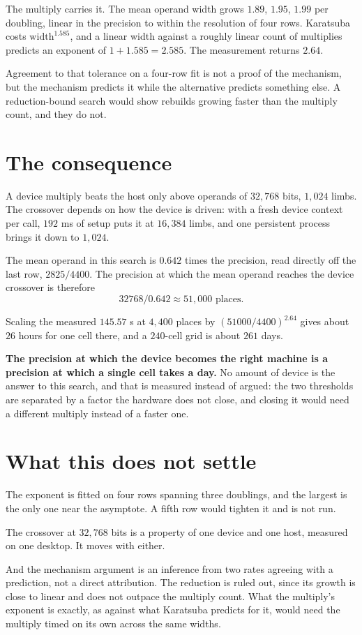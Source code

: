 The multiply carries it. The mean operand width grows \(1.89\), \(1.95\), \(1.99\) per doubling, linear
in the precision to within the resolution of four rows. Karatsuba costs \(\mathrm{width}^{1.585}\), and
a linear width against a roughly linear count of multiplies predicts an exponent of
\(1 + 1.585 = 2.585\). The measurement returns \(2.64\).

Agreement to that tolerance on a four-row fit is not a proof of the mechanism, but the mechanism
predicts it while the alternative predicts something else. A reduction-bound search would show
rebuilds growing faster than the multiply count, and they do not.

\section{The consequence}

A device multiply beats the host only above operands of \(32{,}768\) bits, \(1{,}024\) limbs. The
crossover depends on how the device is driven: with a fresh device context per call, \(192\) ms of
setup puts it at \(16{,}384\) limbs, and one persistent process brings it down to \(1{,}024\).

The mean operand in this search is \(0.642\) times the precision, read directly off the last row,
\(2825/4400\). The precision at which the mean operand reaches the device crossover is therefore
\[
32768 / 0.642 \approx 51{,}000 \text{ places}.
\]

Scaling the measured \(145.57\) s at \(4{,}400\) places by \((51000/4400)^{2.64}\) gives about \(26\)
hours for one cell there, and a \(240\)-cell grid is about \(261\) days.

\textbf{The precision at which the device becomes the right machine is a precision at which a single
cell takes a day.} No amount of device is the answer to this search, and that is measured instead of
argued: the two thresholds are separated by a factor the hardware does not close, and closing it would
need a different multiply instead of a faster one.

\section{What this does not settle}

The exponent is fitted on four rows spanning three doublings, and the largest is the only one near
the asymptote. A fifth row would tighten it and is not run.

The crossover at \(32{,}768\) bits is a property of one device and one host, measured on one desktop.
It moves with either.

And the mechanism argument is an inference from two rates agreeing with a prediction, not a direct
attribution. The reduction is ruled out, since its growth is close to linear and does not outpace the
multiply count. What the multiply's exponent is exactly, as against what Karatsuba predicts for it,
would need the multiply timed on its own across the same widths.
